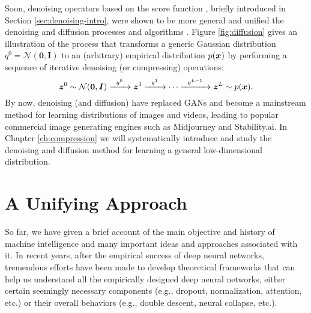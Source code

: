 \documentclass[../../book-main_zh.tex]{subfiles}
\begin{document}
Soon, denoising operators based on the score function \cite{hyvarinen05a}, briefly introduced in Section \ref{sec:denoising-intro}, were shown to be more general and unified the denoising and diffusion processes and algorithms \cite{song2019,song2020score,ho2020denoising}. Figure \ref{fig:diffusion} gives an illustration of the process that transforms a generic Gaussian distribution $q^0 = \mathcal{N}(\boldsymbol{0}, \boldsymbol{I})$ to an (arbitrary) empirical distribution $p(\bm{x})$ by performing a sequence of iterative denoising (or compressing) operations:
\begin{equation}
        \bm{z}^0 \sim  \mathcal{N}(\boldsymbol{0}, \boldsymbol{I})\xrightarrow{\hspace{2mm} g^0  \hspace{2mm}} \bm{z}^1 \xrightarrow{\hspace{2mm} g^1 \hspace{2mm}} \cdots \xrightarrow{\hspace{2mm} g^{L-1}  \hspace{2mm}} \bm{z}^L \sim p(\bm{x}).
\end{equation}
By now, denoising (and diffusion) have replaced GANs and become a mainstream method for learning distributions of images and videos, leading to popular commercial image generating engines such as Midjourney and Stability.ai. 
In Chapter \ref{ch:compression} we will systematically introduce and study the denoising and diffusion method for learning a general low-dimensional distribution.  



\section{A Unifying Approach}\label{sec:unifying-approach}
So far, we have given a brief account of the main objective and history of machine intelligence and many important ideas and approaches associated with it. In recent years, after the empirical success of deep neural networks, tremendous efforts have been made to develop theoretical frameworks that can help us understand all the empirically designed deep neural networks, either certain seemingly necessary components (e.g., dropout,  normalization, attention, etc.) or their overall behaviors (e.g., double descent, neural collapse,  etc.). 
\end{document}
